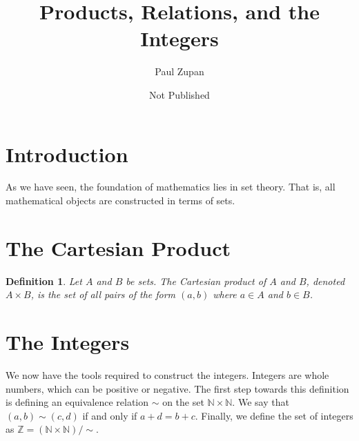\documentclass[12pt, titlepage]{article}
\title{Products, Relations, and the Integers}
\author{Paul Zupan}
\date{Not Published}
\newtheorem{definition}{Definition}
\begin{document}
\maketitle

\section{Introduction}

As we have seen, the foundation of mathematics lies in set theory. That is, all
mathematical objects are constructed in terms of sets.

\section{The Cartesian Product}

\begin{definition}
  Let \(A\) and \(B\) be sets. The Cartesian product of \(A\) and \(B\),
  denoted \(A \times B\), is the set of all pairs of the form \((a, b)\) where
  \(a \in A\) and \(b \in B\).
\end{definition}

\section{The Integers}

We now have the tools required to construct the integers. Integers are whole
numbers, which can be positive or negative. The first step towards this
definition is defining an equivalence relation \(\sim\) on the set \(\mathbb{N}
\times \mathbb{N}\). We say that \((a, b) \sim (c, d)\) if and only if \(a + d
= b + c\). Finally, we define the set of integers as \(\mathbb{Z} = (\mathbb{N}
\times \mathbb{N})/\sim\).
\end{document}
